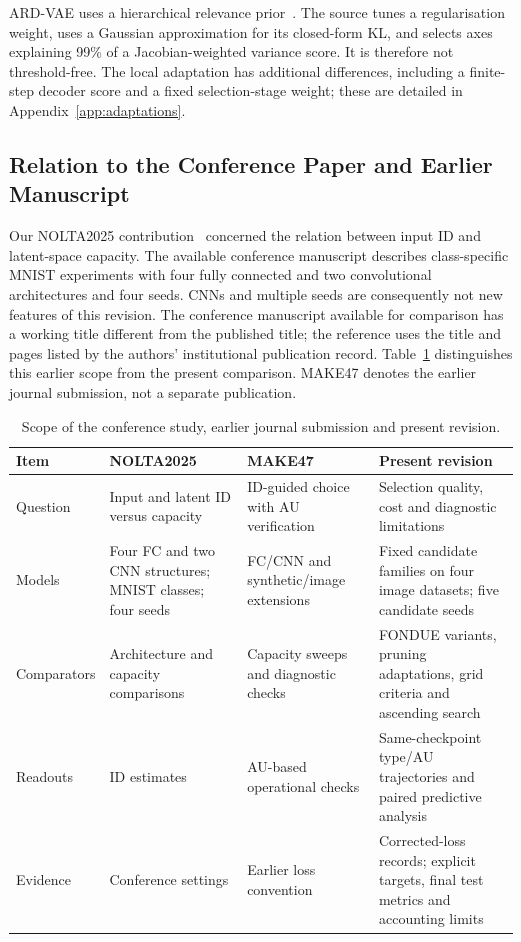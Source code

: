 \documentclass[make,article,submit,pdftex,moreauthors]{Definitions/mdpi}
\begin{document}
ARD-VAE uses a hierarchical relevance prior~\cite{saha2025ardvae}.
The source tunes a regularisation weight, uses a Gaussian approximation
for its closed-form KL, and selects axes explaining 99\% of a
Jacobian-weighted variance score. It is therefore not threshold-free.
The local adaptation has additional differences, including a finite-step
decoder score and a fixed selection-stage weight; these are detailed in
Appendix~\ref{app:adaptations}.

\subsection{Relation to the Conference Paper and Earlier Manuscript}
Our NOLTA2025 contribution~\cite{obata2025manifold} concerned the relation
between input ID and latent-space capacity. The available conference
manuscript describes class-specific MNIST experiments with four fully
connected and two convolutional architectures and four seeds. CNNs and
multiple seeds are consequently not new features of this revision.
The conference manuscript available for comparison has a working title
different from the published title; the reference uses the title and
pages listed by the authors' institutional publication record.
Table~\ref{tab:history} distinguishes this earlier scope from the present
comparison. MAKE47 denotes the earlier journal submission, not a separate
publication.

\begin{table}[H]
\caption{Scope of the conference study, earlier journal submission and present revision.}
\label{tab:history}\small
\begin{tabularx}{\textwidth}{lXXX}\toprule
Item & NOLTA2025 & MAKE47 & Present revision \\\midrule
Question & Input and latent ID versus capacity & ID-guided choice with AU verification & Selection quality, cost and diagnostic limitations \\
Models & Four FC and two CNN structures; MNIST classes; four seeds & FC/CNN and synthetic/image extensions & Fixed candidate families on four image datasets; five candidate seeds \\
Comparators & Architecture and capacity comparisons & Capacity sweeps and diagnostic checks & FONDUE variants, pruning adaptations, grid criteria and ascending search \\
Readouts & ID estimates & AU-based operational checks & Same-checkpoint type/AU trajectories and paired predictive analysis \\
Evidence & Conference settings & Earlier loss convention & Corrected-loss records; explicit targets, final test metrics and accounting limits \\
\bottomrule\end{tabularx}
\end{table}
\end{document}
